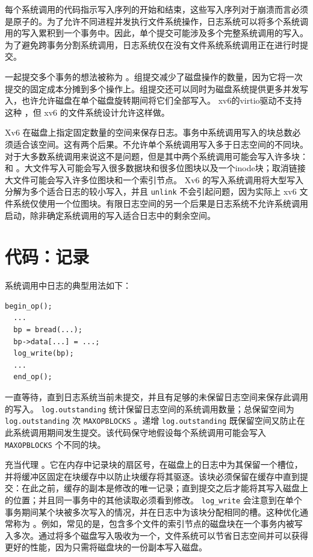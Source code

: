 \documentclass[UTF8]{article}
\begin{document}
每个系统调用的代码指示写入序列的开始和结束，这些写入序列对于崩溃而言必须是原子的。为了允许不同进程并发执行文件系统操作，日志系统可以将多个系统调用的写入累积到一个事务中。因此，单个提交可能涉及多个完整系统调用的写入。为了避免跨事务分割系统调用，日志系统仅在没有文件系统系统调用正在进行时提交。  

一起提交多个事务的想法被称为
        。组提交减少了磁盘操作的数量，因为它将一次提交的固定成本分摊到多个操作上。组提交还可以同时为磁盘系统提供更多并发写入，也许允许磁盘在单个磁盘旋转期间将它们全部写入。 xv6的virtio驱动不支持这种
        ，但 xv6 的文件系统设计允许这样做。  

Xv6 在磁盘上指定固定数量的空间来保存日志。事务中系统调用写入的块总数必须适合该空间。这有两个后果。不允许单个系统调用写入多于日志空间的不同块。对于大多数系统调用来说这不是问题，但是其中两个系统调用可能会写入许多块：
        和
        。大文件写入可能会写入很多数据块和很多位图块以及一个inode块；取消链接大文件可能会写入许多位图块和一个索引节点。 Xv6 的写入系统调用将大型写入分解为多个适合日志的较小写入，并且
    \lstinline{unlink}    不会引起问题，因为实际上 xv6 文件系统仅使用一个位图块。有限日志空间的另一个后果是日志系统不允许系统调用启动，除非确定系统调用的写入适合日志中的剩余空间。
    \section{代码：记录  }     

系统调用中日志的典型用法如下：
    \begin{lstlisting}[]
  begin_op();
  ...
  bp = bread(...);
  bp->data[...] = ...;
  log_write(bp);
  ...
  end_op();
\end{lstlisting}     

        一直等待，直到日志系统当前未提交，并且有足够的未保留日志空间来保存此调用的写入。
    \lstinline{log.outstanding}    统计保留日志空间的系统调用数量；总保留空间为
    \lstinline{log.outstanding}    次
    \lstinline{MAXOPBLOCKS}    。递增
    \lstinline{log.outstanding}    既保留空间又防止在此系统调用期间发生提交。该代码保守地假设每个系统调用可能会写入
    \lstinline{MAXOPBLOCKS}    个不同的块。  

        充当代理
        。它在内存中记录块的扇区号，在磁盘上的日志中为其保留一个槽位，并将缓冲区固定在块缓存中以防止块缓存将其驱逐。该块必须保留在缓存中直到提交：在此之前，缓存的副本是修改的唯一记录；直到提交之后才能将其写入磁盘上的位置；并且同一事务中的其他读取必须看到修改。
    \lstinline{log_write}    会注意到在单个事务期间某个块被多次写入的情况，并在日志中为该块分配相同的槽。这种优化通常称为
        。例如，常见的是，包含多个文件的索引节点的磁盘块在一个事务内被写入多次。通过将多个磁盘写入吸收为一个，文件系统可以节省日志空间并可以获得更好的性能，因为只需将磁盘块的一份副本写入磁盘。  
\end{document}
